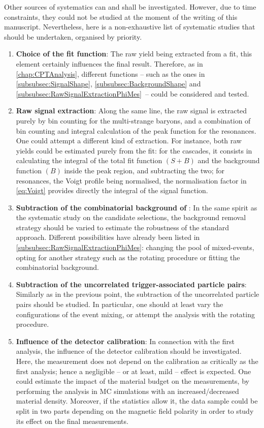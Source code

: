 Other sources of systematics can and shall be investigated. However, due to time constraints, they could not be studied at the moment of the writing of this manuscript. Nevertheless, here is a non-exhaustive list of systematic studies that should be undertaken, organised by priority.

\begin{enumerate}
\item \textbf{Choice of the fit function}: The raw yield being extracted from a fit, this element certainly influences the final result. Therefore, as in \chap\ref{chap:CPTAnalysis}, different functions -- such as the ones in \Sec\ref{subsubsec:SignalShape}, \Sec\ref{subsubsec:BackgroundShape} and \break\Sec\ref{subsubsec:RawSignalExtractionPhiMes}~-- could be considered and tested.
\item \textbf{Raw signal extraction}: Along the same line, the raw signal is extracted purely by bin counting for the multi-strange baryons, and a combination of bin counting and integral calculation of the peak function for the resonances. One could attempt a different kind of extraction. For instance, both raw yields could be estimated purely from the fit: for the cascades, it consists in calculating the integral of the total fit function $(S+B)$ and the background function $(B)$ inside the peak region, and subtracting the two; for resonances, the Voigt profile being normalised, the normalisation factor in \eq\ref{eq:Voigt} provides directly the integral of the signal function.
\item \textbf{Subtraction of the combinatorial background of \rmPhiMes}: In the same spirit as the systematic study on the candidate selections, the background removal strategy should be varied to estimate the robustness of the standard approach. Different possibilities have already been listed in \Sec\ref{subsubsec:RawSignalExtractionPhiMes}: changing the pool of mixed-events, opting for another strategy such as the rotating procedure or fitting the combinatorial background.
\item \textbf{Subtraction of the uncorrelated trigger-associated particle pairs}: Similarly as in the previous point, the subtraction of the uncorrelated particle pairs should be studied. In particular, one should at least vary the configurations of the event mixing, or attempt the analysis with the rotating procedure.
\item \textbf{Influence of the detector calibration}: In connection with the first analysis, the influence of the detector calibration should be investigated. Here, the measurement does not depend on the calibration as critically as the first analysis; hence a negligible -- or at least, mild -- effect is expected. One could estimate the impact of the material budget on the measurements, by performing the analysis in MC simulations with an increased/decreased material density. Moreover, if the statistics allow it, the data sample could be split in two parts depending on the magnetic field polarity in order to study its effect on the final measurements.
\end{enumerate}

